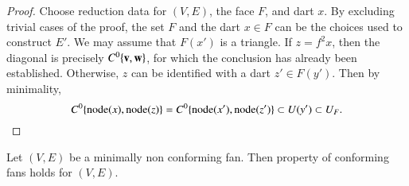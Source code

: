 \begin{proof}  
Choose reduction data for $(V,E)$, the face $F$, and dart $x$.  By
excluding trivial cases of the proof, the set $F$ and the dart $x\in
F$ can be the choices used to construct $E'$.  We may assume that
$F(x')$ is a triangle.  If $z=f^2x$, then the diagonal is precisely
$C^0\{{\mathbf v},{\mathbf w}\}$, for which the conclusion has already been
established.  Otherwise, $z$ can be identified with a dart $z'\in
F(y')$.  Then by minimality,
\begin{displaymath}
C^0\{{\operatorname{node}}(x),{\operatorname{node}}(z)\} = C^0\{{\operatorname{node}}(x'),{\operatorname{node}}(z')\} \subset U(y') \subset U_F.
\end{displaymath}
\end{proof}


\begin{lemma} Let $(V,E)$ be a minimally non
conforming fan.  Then property  of conforming fans
holds for $(V,E)$.
\end{lemma}
%

